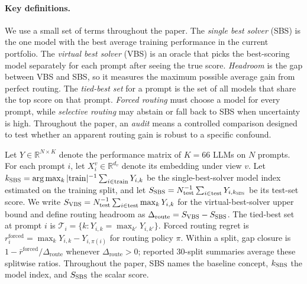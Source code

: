 \documentclass{article}
\newcommand{\sbs}{\textsc{SBS}}
\newcommand{\vbs}{\textsc{VBS}}
\newcommand{\headroom}{\Delta_{\text{route}}}
\newcommand{\tieset}{\mathcal{T}_i}
\newcommand{\sbsidx}{k_{\textsc{SBS}}}
\newcommand{\sbsscore}{S_{\textsc{SBS}}}
\newcommand{\vbsscore}{S_{\textsc{VBS}}}
\begin{document}
\paragraph{Key definitions.}
We use a small set of terms throughout the paper. The \emph{single best solver} (\sbs) is the one model with the best average training performance in the current portfolio. The \emph{virtual best solver} (\vbs) is an oracle that picks the best-scoring model separately for each prompt after seeing the true score. \emph{Headroom} is the gap between \vbs{} and \sbs{}, so it measures the maximum possible average gain from perfect routing. The \emph{tied-best set} for a prompt is the set of all models that share the top score on that prompt. \emph{Forced routing} must choose a model for every prompt, while \emph{selective routing} may abstain or fall back to \sbs{} when uncertainty is high. Throughout the paper, an \emph{audit} means a controlled comparison designed to test whether an apparent routing gain is robust to a specific confound.

Let $Y \in \mathbb{R}^{N \times K}$ denote the performance matrix of $K=66$ LLMs on $N$ prompts. For each prompt $i$, let $X_i^v \in \mathbb{R}^{d_v}$ denote its embedding under view $v$. Let $\sbsidx = \arg\max_k |\mathrm{train}|^{-1}\sum_{i \in \mathrm{train}} Y_{i,k}$ be the single-best-solver model index estimated on the training split, and let $\sbsscore = N_{\mathrm{test}}^{-1}\sum_{i \in \mathrm{test}} Y_{i,\sbsidx}$ be its test-set score. We write $\vbsscore = N_{\mathrm{test}}^{-1}\sum_{i \in \mathrm{test}} \max_k Y_{i,k}$ for the virtual-best-solver upper bound and define routing headroom as $\headroom = \vbsscore - \sbsscore$. The tied-best set at prompt $i$ is $\tieset = \{k : Y_{i,k} = \max_{k'} Y_{i,k'}\}$. Forced routing regret is $r_i^{\text{forced}} = \max_k Y_{i,k} - Y_{i,\pi(i)}$ for routing policy $\pi$. Within a split, gap closure is $1-\bar r^{\text{forced}}/\headroom$ whenever $\headroom>0$; reported 30-split summaries average these splitwise ratios. Throughout the paper, \sbs{} names the baseline concept, $\sbsidx$ the model index, and $\sbsscore$ the scalar score.
\end{document}
